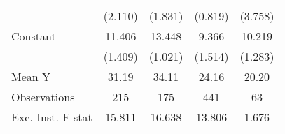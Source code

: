 {\begin{tabular}{l*{4}{c}}
                    &     (2.110)         &     (1.831)         &     (0.819)         &     (3.758)         \\
\addlinespace
Constant            &      11.406\sym{***}&      13.448\sym{***}&       9.366\sym{***}&      10.219\sym{***}\\
                    &     (1.409)         &     (1.021)         &     (1.514)         &     (1.283)         \\
\midrule
Mean Y              &       31.19         &       34.11         &       24.16         &       20.20         \\
Observations        &         215         &         175         &         441         &          63         \\
Exc. Inst. F-stat   &      15.811         &      16.638         &      13.806         &       1.676         \\
\bottomrule
\end{tabular}
}
